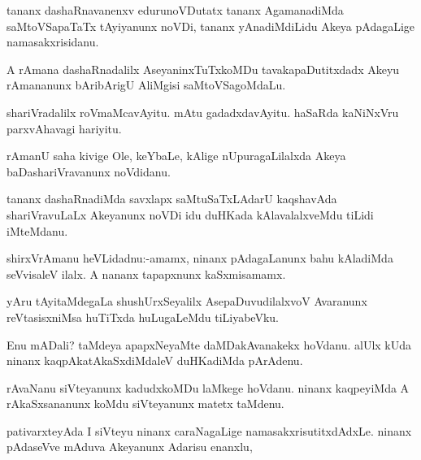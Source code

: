 \documentclass{article}
\begin{document}
\begin{mn}%
tananx dashaRnavanenxv edurunoVDutatx tananx AgamanadiMda saMtoVSapaTaTx tAyiyanunx noVDi, 
tananx yAnadiMdiLidu Akeya pAdagaLige namasakxrisidanu.
\end{mn}

\begin{mn}%
A rAmana dashaRnadalilx AseyaninxTuTxkoMDu tavakapaDutitxdadx Akeyu rAmananunx bAribArigU 
AliMgisi saMtoVSagoMdaLu.
\end{mn}

\begin{mn}%
shariVradalilx roVmaMcavAyitu. mAtu gadadxdavAyitu. haSaRda kaNiNxVru parxvAhavagi hariyitu.
\end{mn}

\begin{mn}%
rAmanU saha kivige Ole, keYbaLe, kAlige nUpuragaLilalxda Akeya baDashariVravanunx noVdidanu.
\end{mn}

\begin{mn}%
tananx dashaRnadiMda savxlapx saMtuSaTxLAdarU kaqshavAda shariVravuLaLx Akeyanunx noVDi idu 
duHKada kAlavalalxveMdu tiLidi iMteMdanu.
\end{mn}

\begin{mn}%
shirxVrAmanu heVLidadnu:-amamx, ninanx pAdagaLanunx bahu kAladiMda seVvisaleV ilalx. A nananx
tapapxnunx kaSxmisamamx.
\end{mn}

\begin{mn}%
yAru tAyitaMdegaLa shushUrxSeyalilx AsepaDuvudilalxvoV Avaranunx reVtasisxniMsa huTiTxda 
huLugaLeMdu tiLiyabeVku.
\end{mn}

\begin{mn}%
Enu mADali? taMdeya apapxNeyaMte daMDakAvanakekx hoVdanu. alUlx kUda ninanx 
kaqpAkatAkaSxdiMdaleV duHKadiMda pArAdenu.
\end{mn}

\begin{mn}%
rAvaNanu siVteyanunx kadudxkoMDu laMkege hoVdanu. ninanx kaqpeyiMda A rAkaSxsananunx koMdu 
siVteyanunx matetx taMdenu.
\end{mn}

\begin{mn}%
pativarxteyAda I siVteyu ninanx caraNagaLige namasakxrisutitxdAdxLe. ninanx pAdaseVve mAduva Akeyanunx Adarisu enanxlu, 
\end{mn}
\end{document}
